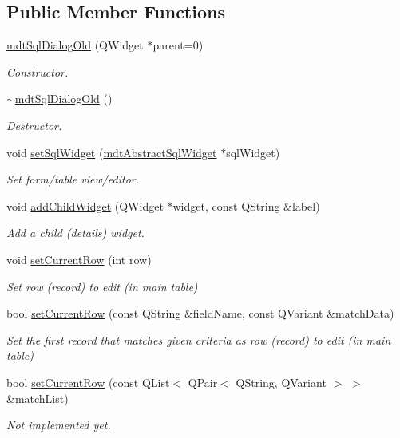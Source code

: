 \subsection*{Public Member Functions}
\begin{DoxyCompactItemize}
\item 
\hyperlink{classmdt_sql_dialog_old_a09d803b8fdeda106f5e09c74cd083777}{mdtSqlDialogOld} (QWidget $\ast$parent=0)
\begin{DoxyCompactList}\small\item\em Constructor. \end{DoxyCompactList}\item 
\hypertarget{classmdt_sql_dialog_old_ad94d87750cbe3f4b8d90ad486e0ae2dd}{
\hyperlink{classmdt_sql_dialog_old_ad94d87750cbe3f4b8d90ad486e0ae2dd}{$\sim$mdtSqlDialogOld} ()}
\label{classmdt_sql_dialog_old_ad94d87750cbe3f4b8d90ad486e0ae2dd}

\begin{DoxyCompactList}\small\item\em Destructor. \end{DoxyCompactList}\item 
void \hyperlink{classmdt_sql_dialog_old_ab164a92148ee8c41687f8ec461199924}{setSqlWidget} (\hyperlink{classmdt_abstract_sql_widget}{mdtAbstractSqlWidget} $\ast$sqlWidget)
\begin{DoxyCompactList}\small\item\em Set form/table view/editor. \end{DoxyCompactList}\item 
void \hyperlink{classmdt_sql_dialog_old_a009ae8ce4b25cd143fd19b0d680c2aa1}{addChildWidget} (QWidget $\ast$widget, const QString \&label)
\begin{DoxyCompactList}\small\item\em Add a child (details) widget. \end{DoxyCompactList}\item 
void \hyperlink{classmdt_sql_dialog_old_aa632b9e478abfd39fb619017ad858588}{setCurrentRow} (int row)
\begin{DoxyCompactList}\small\item\em Set row (record) to edit (in main table) \end{DoxyCompactList}\item 
bool \hyperlink{classmdt_sql_dialog_old_a8a037786d182ce5c521a09f98c32cbeb}{setCurrentRow} (const QString \&fieldName, const QVariant \&matchData)
\begin{DoxyCompactList}\small\item\em Set the first record that matches given criteria as row (record) to edit (in main table) \end{DoxyCompactList}\item 
bool \hyperlink{classmdt_sql_dialog_old_a658d4a0a9bc97cb8a354a5b2157ab1a0}{setCurrentRow} (const QList$<$ QPair$<$ QString, QVariant $>$ $>$ \&matchList)
\begin{DoxyCompactList}\small\item\em Not implemented yet. \end{DoxyCompactList}\end{DoxyCompactItemize}


